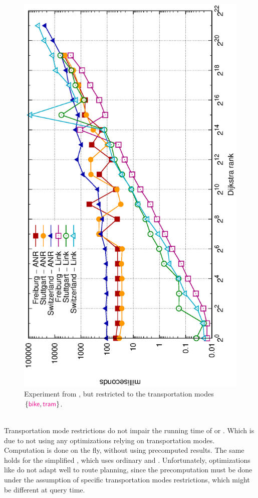 	\begin{figure}[!ht]
		 \begin{center}
			\includegraphics[scale=0.55,angle=-90]{res/plots/multiModalResultsRestricted}
		\end{center}
		\caption{Experiment from , but restricted to the transportation modes $\{\textcolor{magenta}{\textsf{bike}}, \textcolor{magenta}{\textsf{tram}}\}$.}
		\label{multiModalResultsRestricted}
	\end{figure}\quad\\
	Transportation mode restrictions do not impair the running time of \dijkstra or \anr. Which is due to \dijkstra not using any
	optimizations relying on transportation modes. Computation is done on the fly, without using precomputed results. The same holds for
	the simplified \anr, which uses ordinary \dijkstra and \csa. Unfortunately, optimizations like \alt do not adapt well to \multiModal route planning,
	since the precomputation must be done under the assumption of specific transportation modes restrictions, which might be different at query time.
	
